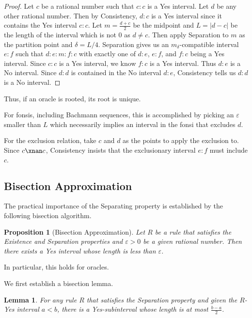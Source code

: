 \documentclass[12pt]{article}
\newtheorem{lemma}{Lemma}[subsection]
\newtheorem{proposition}{Proposition}[subsection]
\begin{document}
\begin{proof}
    Let $c$ be a rational number such that $c:c$ is a Yes interval. Let $d$ be any other rational number. Then by Consistency, $d:c$ is a Yes interval since it contains the Yes interval $c:c$. Let $m = \frac{d+c}{2}$ be the midpoint and $L=|d-c|$ be the length of the interval which is not 0 as $d \neq c$. Then apply Separation to $m$ as the partition point and $\delta=L/4$. Separation gives us an $m_{\delta}$-compatible interval $e:f$ such that $d:e:m:f:c$ with exactly one of $d:e$, $e:f$, and $f:c$ being a Yes interval. Since $c:c$ is a Yes interval, we know $f:c$ is a Yes interval. Thus $d:e$ is a No interval. Since $d:d$ is contained in the No interval $d:e$, Consistency tells us $d:d$ is a No interval. 
\end{proof}

Thus, if an oracle is rooted, its root is unique. 

For fonsis, including Bachmann sequences, this is accomplished by picking an $\varepsilon$ smaller than $L$ which necessarily implies an interval in the fonsi that excludes $d$. 

For the exclusion relation, take $c$ and $d$ as the points to apply the exclusion to. Since $c \xnan c$, Consistency insists that the exclusionary interval $e:f$ must include $c$. 


\subsection{Bisection Approximation}

The practical importance of the Separating property is established by the following bisection algorithm. 

\begin{proposition}[Bisection Approximation]\label{pr:short}
Let $R$ be a rule that satisfies the Existence and Separation properties and $\varepsilon > 0$ be a given rational number. Then there exists a Yes interval whose length is less than $\varepsilon$.
\end{proposition}

In particular, this holds for oracles. 

We first establish a bisection lemma.

\begin{lemma}
   For any rule $R$ that satisfies the Separation property and given the $R$-Yes interval $a\lt b$, there is a Yes-subinterval whose length is at most $\frac{b-a}{2}$. 
\end{lemma}
\end{document}
